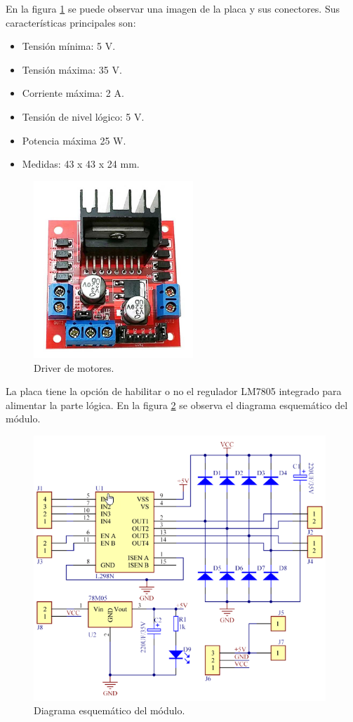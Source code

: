 En la figura \ref{fig:Driver} se puede observar una imagen de la placa y sus conectores. Sus características principales son:

\begin{itemize}
	\item Tensión mínima: 5 V.
	\item Tensión máxima: 35 V.
	\item Corriente máxima: 2 A.
	\item Tensión de nivel lógico: 5 V.
	\item Potencia máxima 25 W.
	\item Medidas: 43 x 43 x 24 mm.
\end{itemize}

\begin{figure}[h]
	\centering
	\includegraphics[width=6cm]{./Figures/L298N.png}
	\caption{Driver de motores\protect\footnotemark.}
	\label{fig:Driver}
\end{figure}


La placa tiene la opción de habilitar o no el regulador LM7805 integrado para alimentar la parte lógica. En la figura \ref{fig:Esquema} se observa el diagrama esquemático del módulo.


\begin{figure}[h]
	\centering
	\includegraphics[width=11cm]{./Figures/Modulo.png}
	\caption{Diagrama esquemático del módulo\protect\footnotemark.}
	\label{fig:Esquema}
\end{figure}


